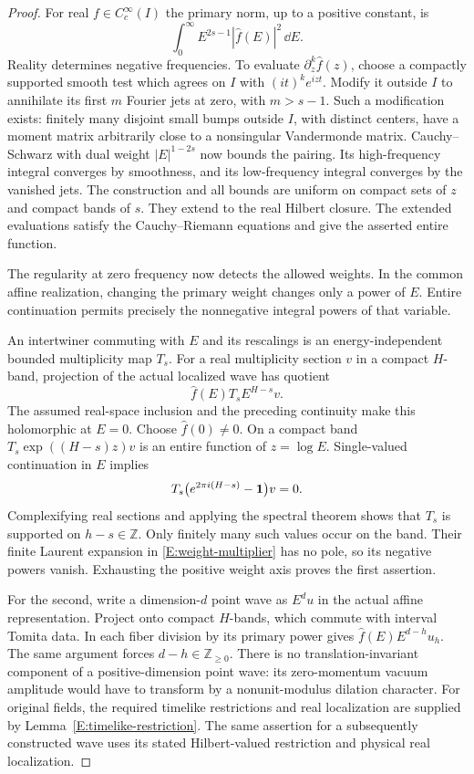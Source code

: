 \begin{proof}
For real $f\in C_c^\infty(I)$ the primary norm, up to a positive
constant, is
\[
 \int_0^\infty E^{2s-1}|\widehat f(E)|^2\,\dd E.
\]
Reality determines negative frequencies.  To evaluate
$\partial_z^k\widehat f(z)$, choose a compactly supported smooth test
which agrees on $I$ with $(it)^k e^{izt}$.  Modify it outside $I$ to
annihilate its first $m$ Fourier jets at zero, with $m>s-1$.
Such a modification exists: finitely many disjoint small bumps outside
$I$, with distinct centers, have a moment matrix arbitrarily close to
a nonsingular Vandermonde matrix.  Cauchy--Schwarz with dual weight
$|E|^{1-2s}$ now bounds the pairing.  Its high-frequency integral
converges by smoothness, and its low-frequency integral converges by
the vanished jets.  The construction and all bounds are uniform on
compact sets of $z$ and compact bands of $s$.  They extend to the real
Hilbert closure.  The extended evaluations satisfy the
Cauchy--Riemann equations and give the asserted entire function.

The regularity at zero frequency now detects the allowed weights.
In the common affine realization, changing the primary weight changes
only a power of $E$.  Entire continuation permits precisely the
nonnegative integral powers of that variable.

An intertwiner commuting with $E$ and its rescalings is an
energy-independent bounded multiplicity map $T_s$.  For a real
multiplicity section $v$ in a compact $H$-band, projection of the actual
localized wave has quotient
\begin{equation}\label{E:weight-multiplier}
 \widehat f(E)T_s E^{H-s}v.
\end{equation}
The assumed real-space inclusion and the preceding continuity make
this holomorphic at $E=0$.  Choose $\widehat f(0)\ne0$.  On a compact
band $T_s\exp((H-s)z)v$ is an entire function of $z=\log E$.
Single-valued continuation in $E$ implies
\[
 T_s\bigl(e^{2\pi i(H-s)}-\mathbf 1\bigr)v=0.
\]
Complexifying real sections and applying the spectral theorem shows
that $T_s$ is supported on $h-s\in\mathbb Z$.  Only finitely many
such values occur on the band.  Their finite Laurent expansion in
\eqref{E:weight-multiplier} has no pole, so its negative powers vanish.
Exhausting the positive weight axis proves the first assertion.

For the second, write a dimension-$d$ point wave as $E^d u$ in the
actual affine representation.  Project onto compact $H$-bands, which
commute with interval Tomita data.  In each fiber division by its
primary power gives $\widehat f(E)E^{d-h}u_h$.  The same argument forces
$d-h\in\mathbb Z_{\geq0}$.  There is no translation-invariant component
of a positive-dimension point wave: its zero-momentum vacuum amplitude
would have to transform by a nonunit-modulus dilation character.
For original fields, the required timelike restrictions and real
localization are supplied by Lemma~\ref{E:timelike-restriction}.
The same assertion for a subsequently constructed wave uses its stated
Hilbert-valued restriction and physical real localization.
\end{proof}

